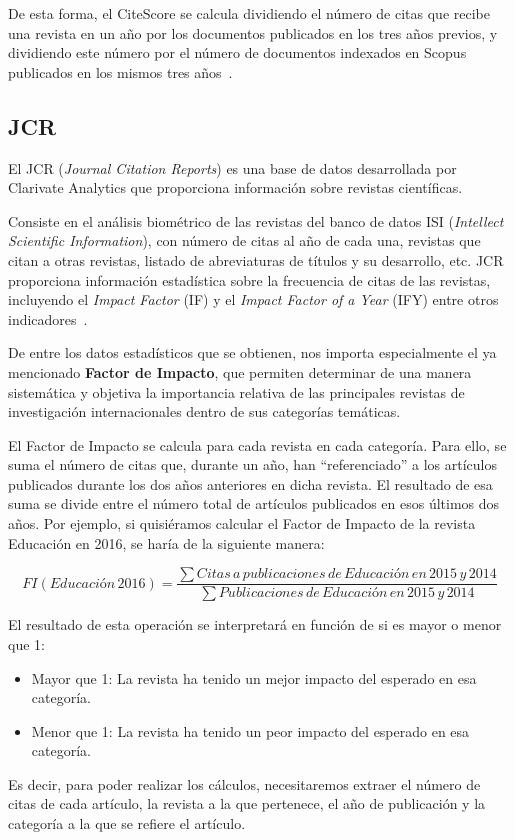 De esta forma, el CiteScore se calcula dividiendo el número de citas que recibe una revista en un año por los documentos publicados en los tres años previos, y dividiendo este número por el número de documentos indexados en Scopus publicados en los mismos tres años~\cite{Svetla2022}. 


\subsection{JCR}
El JCR (\textit{Journal Citation Reports}) es una base de datos desarrollada por Clarivate Analytics que proporciona información sobre revistas científicas.

Consiste en el análisis biométrico de las revistas del banco de datos ISI (\textit{Intellect Scientific Information}), con número de citas al año de cada una, revistas que citan a otras revistas, listado de abreviaturas de títulos y su desarrollo, etc. JCR proporciona información estadística sobre la frecuencia de citas de las revistas, incluyendo el \textit{Impact Factor} (IF) y el \textit{Impact Factor of a Year} (IFY) entre otros indicadores~\cite{clarivate2019}. 

De entre los datos estadísticos que se obtienen, nos importa especialmente el ya mencionado \textbf{Factor de Impacto}, que permiten determinar de una manera sistemática y objetiva la importancia relativa de las principales revistas de investigación internacionales dentro de sus categorías temáticas. 

El Factor de Impacto se calcula para cada revista en cada categoría. Para ello, se suma el número de citas que, durante un año, han ``referenciado'' a los artículos publicados durante los dos años anteriores en dicha revista. El resultado de esa suma se divide entre el número total de artículos publicados en esos últimos dos años.
Por ejemplo, si quisiéramos calcular el Factor de Impacto de la revista Educación en 2016, se haría de la siguiente manera:

\begin{equation}
FI(Educación\,2016) = \frac{\sum{Citas\,a\,publicaciones\,de\,Educación\,en\,2015\,y\,2014}}{\sum{Publicaciones\,de\,Educación\,en\,2015\,y\,2014}}
\end{equation}

 
El resultado de esta operación se interpretará en función de si es mayor o menor que 1:
\begin{itemize}
	\item Mayor que 1: La revista ha tenido un mejor impacto del esperado en esa categoría.
	\item Menor que 1: La revista ha tenido un peor impacto del esperado en esa categoría.
\end{itemize}
Es decir, para poder realizar los cálculos, necesitaremos extraer el número de citas de cada artículo, la revista a la que pertenece, el año de publicación y la categoría a la que se refiere el artículo.


